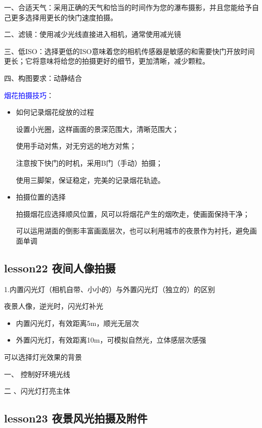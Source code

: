 \documentclass{book}
\begin{document}
一、合适天气：采用正确的天气和恰当的时间作为您的瀑布摄影，并且您能给予自己更多选择用更长的快门速度拍摄。

二、滤镜：使用减少光线直接进入相机，通常使用减光镜

三、低ISO：选择更低的ISO意味着您的相机传感器是敏感的和需要快门开放时间更长；它将意味将给您的拍摄更好的细节，更加清晰，减少颗粒。

四、构图要求：动静结合

\textcolor{blue}{烟花拍摄技巧}：\begin{itemize}
                           \item 如何记录烟花绽放的过程

                           设置小光圈，这样画面的景深范围大，清晰范围大；

                           使用手动对焦，对无穷远的地方对焦；

                           注意按下快门的时机，采用B门（手动）拍摄；

                           使用三脚架，保证稳定，完美的记录烟花轨迹。
                           \item 拍摄位置的选择

                           拍摄烟花应选择顺风位置，风可以将烟花产生的烟吹走，使画面保持干净；

                           可以运用湖面的倒影丰富画面层次，也可以利用城市的夜景作为衬托，避免画面单调
                         \end{itemize}

\subsection{lesson22 夜间人像拍摄}

1.内置闪光灯（相机自带、小小的）与外置闪光灯（独立的）的区别

夜景人像，逆光时，闪光灯补光

\begin{itemize}
  \item 内置闪光灯，有效距离5m，顺光无层次
  \item 外置闪光灯，有效距离10m，可模拟自然光，立体感层次感强
\end{itemize}

可以选择灯光效果的背景

一、 控制好环境光线

二 、闪光灯打亮主体

\subsection{lesson23 夜景风光拍摄及附件}
\end{document}
